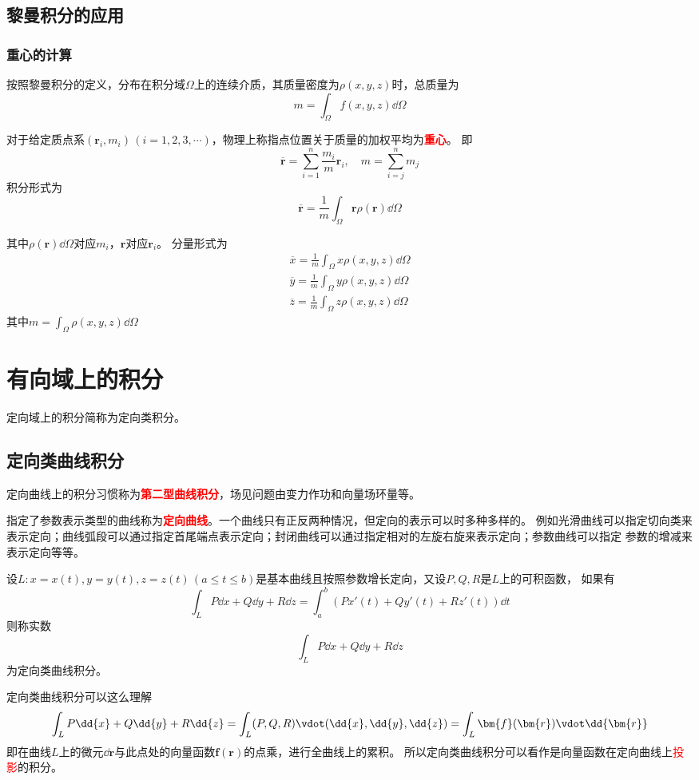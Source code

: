 \subsection{黎曼积分的应用}
\subsubsection{重心的计算}
按照黎曼积分的定义，分布在积分域$\Omega$上的连续介质，其质量密度为$\rho(x,y,z)$时，总质量为
\[ m = \int_\Omega f(x,y,z)\dd{\Omega} \]

对于给定质点系$(\bm{r}_i,m_i)\,(i=1,2,3,\cdots)$，物理上称指点位置关于质量的加权平均为\textcolor{red}{\textbf{\textsf{重心}}}。
即
\[ \overline{\bm{r}} = \sum_{i=1}^{n} \frac{m_i}{m}\bm{r}_i, \quad m = \sum_{i=j}^n m_j \]
积分形式为
\begin{equation}
    \overline{\bm{r}} = \frac{1}{m}\int_\Omega \bm{r} \rho(\bm{r})\dd{\Omega}
\end{equation}

其中$\rho(\bm{r})\dd{\Omega}$对应$m_i$，$\bm{r}$对应$\bm{r}_i$。
分量形式为
\begin{align}
    \overline{x} = \frac{1}{m}\int_\Omega x\rho(x,y,z)\dd{\Omega} \\
    \overline{y} = \frac{1}{m}\int_\Omega y\rho(x,y,z)\dd{\Omega} \\
    \overline{z} = \frac{1}{m}\int_\Omega z\rho(x,y,z)\dd{\Omega}
\end{align}
其中$\displaystyle m = \int_\Omega \rho(x,y,z)\dd{\Omega}$

\section{有向域上的积分}
定向域上的积分简称为定向类积分。
\subsection{定向类曲线积分}
定向曲线上的积分习惯称为\textcolor{red}{\textbf{\textsf{第二型曲线积分}}}，场见问题由变力作功和向量场环量等。

指定了参数表示类型的曲线称为\textcolor{red}{\textbf{\textsf{定向曲线}}}。一个曲线只有正反两种情况，但定向的表示可以时多种多样的。
例如光滑曲线可以指定切向类来表示定向；曲线弧段可以通过指定首尾端点表示定向；封闭曲线可以通过指定相对的左旋右旋来表示定向；参数曲线可以指定
参数的增减来表示定向等等。

\begin{definition}
    设$L:x=x(t),y=y(t),z=z(t)\,(a\leq t\leq b)$是基本曲线且按照参数增长定向，又设$P,Q,R$是$L$上的可积函数，
    如果有
    \[ \int_L P\dd{x} + Q\dd{y} + R\dd{z} = \int_a^b (Px'(t) + Qy'(t) + Rz'(t))\dd{t} \]
    则称实数
    \[ \int_L P\dd{x} + Q\dd{y} + R\dd{z} \]
    为定向类曲线积分。
\end{definition}
定向类曲线积分可以这么理解
\[ \int_L P\dd{x} + Q\dd{y} + R\dd{z} = \int_L (P,Q,R) \vdot (\dd{x},\dd{y},\dd{z}) = \int_L \bm{f}(\bm{r}) \vdot \dd{\bm{r}} \]
即在曲线$L$上的微元$\dd{\bm{r}}$与此点处的向量函数$\bm{f}(\bm{r})$的点乘，进行全曲线上的累积。
所以定向类曲线积分可以看作是向量函数在定向曲线上\textcolor{red}{投影}的积分。

